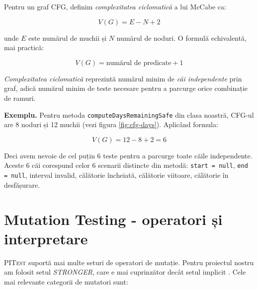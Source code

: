 Pentru un graf CFG, definim \textit{complexitatea ciclomatică} a lui McCabe \cite{mccabe1976} ca:

\begin{equation}
V(G) = E - N + 2
\end{equation}

unde $E$ este numărul de muchii și $N$ numărul de noduri. O formulă echivalentă, mai practică:

\begin{equation}
V(G) = \text{numărul de predicate} + 1
\end{equation}

\textit{Complexitatea ciclomatică} reprezintă numărul minim de \textit{căi independente} prin graf, adică numărul minim de teste necesare pentru a parcurge orice combinație de ramuri.

\textbf{Exemplu.} Pentru metoda \texttt{computeDaysRemainingSafe} din clasa noastră, CFG-ul are 8 noduri și 12 muchii (vezi figura \ref{fig:cfg-days}). Aplicând formula:

\begin{equation*}
V(G) = 12 - 8 + 2 = 6
\end{equation*}

Deci avem nevoie de cel puțin 6 teste pentru a parcurge toate căile independente. Aceste 6 căi corespund celor 6 scenarii distincte din metodă: \texttt{start = null}, \texttt{end = null}, interval invalid, călătorie încheiată, călătorie viitoare, călătorie în desfășurare.

\section{Mutation Testing - operatori și interpretare}

\textsc{PITest} suportă mai multe seturi de operatori de mutație. Pentru proiectul nostru am folosit setul \textit{STRONGER}, care e mai cuprinzător decât setul implicit \cite{pitest_mutators}. Cele mai relevante categorii de mutatori sunt:

